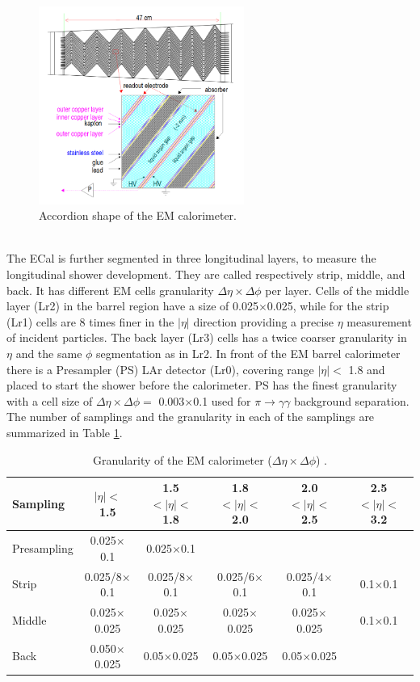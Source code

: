 \begin{figure}[htbp]
    \centering
    \includegraphics[width=0.6\textwidth]{Ch2/Img/ECal_accord.png}
    \caption{Accordion shape of the EM calorimeter.}
    \label{fig:chap2:ATLAS:Calo:ECal:Acc}
\end{figure}
\\
The ECal is further segmented in three longitudinal layers, to measure the longitudinal shower development. They are called respectively strip, middle, and back. It has different EM cells granularity $\Delta\eta\times\Delta\phi$ per layer. Cells of the middle layer (Lr2) in the barrel region have a size of 0.025$\times$0.025, while for the strip (Lr1) cells are 8 times finer in the $|\eta|$ direction providing a precise $\eta$ measurement of incident particles. The back layer (Lr3) cells has a twice coarser granularity in $\eta$ and the same $\phi$ segmentation as in Lr2. In front of the EM barrel calorimeter there is a Presampler (PS) LAr detector (Lr0), covering range $|\eta| < $ 1.8 and placed to start the shower before the calorimeter. PS has the finest granularity with a cell size of $\Delta\eta\times\Delta\phi =$  0.003$\times$0.1 used for $\pi\rightarrow\gamma\gamma$ background separation. The number of samplings  and the granularity in each of the samplings are summarized in Table \ref{tab:chap2:ATLAS:Calo:ECal:Gr}. \\
\begin{table}[htbp]
    \centering
    \begin{tabular}{lccccc}
    \hline
    Sampling & $|\eta| < $ 1.5 & 1.5 $ < |\eta| < $ 1.8 & 1.8 $ < |\eta| < $ 2.0 & 2.0 $ < |\eta| < $ 2.5 & 2.5 $ < |\eta| < $ 3.2 \\
    \hline
    \hline
        Presampling & 0.025$\times$0.1 & 0.025$\times$0.1  \\
        Strip & 0.025/8$\times$0.1 & 0.025/8$\times$0.1 & 0.025/6$\times$0.1 & 0.025/4$\times$0.1 & 0.1$\times$0.1 \\
        Middle & 0.025$\times$0.025 & 0.025$\times$0.025 & 0.025$\times$0.025 & 0.025$\times$0.025 & 0.1$\times$0.1 \\
        Back & 0.050$\times$0.025 & 0.05$\times$0.025 & 0.05$\times$0.025 & 0.05$\times$0.025 \\
        \hline
    \end{tabular}
    \caption{Granularity of the EM calorimeter ($\Delta\eta\times\Delta\phi$) \cite{LAr_TRD}.}
    \label{tab:chap2:ATLAS:Calo:ECal:Gr}
\end{table}
